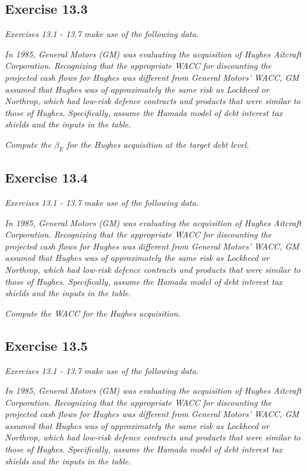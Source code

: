 \documentclass[]{book}
\theoremstyle{definition}
\theoremstyle{definition}
\theoremstyle{remark}
\begin{document}
\subsection{Exercise 13.3}\label{exercise-13.3}

\emph{Exercises 13.1 - 13.7 make use of the following data.}
\citep[p.458]{book}

\emph{In 1985, General Motors (GM) was evaluating the acquisition of
Hughes Aitcraft Corporation. Recognizing that the appropriate WACC for
discounting the projected cash flows for Hughes was different from
General Motors' WACC, GM assumed that Hughes was of approximately the
same risk as Lockheed or Northrop, which had low-risk defence contracts
and products that were similar to those of Hughes. Specifically, assume
the Hamada model of debt interest tax shields and the inputs in the
table.} \citep[p.458]{book}

\emph{Compute the \(\beta_E\) for the Hughes acquisition at the target
debt level.} \citep[p.459]{book}

\subsection{Exercise 13.4}\label{exercise-13.4}

\emph{Exercises 13.1 - 13.7 make use of the following data.}
\citep[p.458]{book}

\emph{In 1985, General Motors (GM) was evaluating the acquisition of
Hughes Aitcraft Corporation. Recognizing that the appropriate WACC for
discounting the projected cash flows for Hughes was different from
General Motors' WACC, GM assumed that Hughes was of approximately the
same risk as Lockheed or Northrop, which had low-risk defence contracts
and products that were similar to those of Hughes. Specifically, assume
the Hamada model of debt interest tax shields and the inputs in the
table.} \citep[p.458]{book}

\emph{Compute the WACC for the Hughes acquisition.} \citep[p.459]{book}

\subsection{Exercise 13.5}\label{exercise-13.5}

\emph{Exercises 13.1 - 13.7 make use of the following data.}
\citep[p.458]{book}

\emph{In 1985, General Motors (GM) was evaluating the acquisition of
Hughes Aitcraft Corporation. Recognizing that the appropriate WACC for
discounting the projected cash flows for Hughes was different from
General Motors' WACC, GM assumed that Hughes was of approximately the
same risk as Lockheed or Northrop, which had low-risk defence contracts
and products that were similar to those of Hughes. Specifically, assume
the Hamada model of debt interest tax shields and the inputs in the
table.} \citep[p.458]{book}
\end{document}
